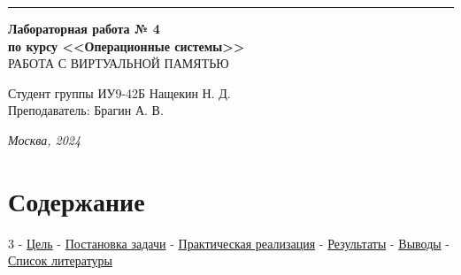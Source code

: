 \documentclass[a4paper, 14pt]{extarticle}
\begin{document}
\begin{titlepage}
\vspace*{-16pt}
\hspace{30pt}\rule{0.866\textwidth}{0.4pt}
  
\vspace{11em}

\begin{center}
\Large {\bf Лабораторная работа № 4} \\ 
\large {\bf по курсу <<Операционные системы>>} \\ 
{РАБОТА С ВИРТУАЛЬНОЙ ПАМЯТЬЮ} \\
\end{center}\normalsize

\vspace{8em}


\begin{flushright}
  {Студент группы ИУ9-42Б Нащекин Н. Д.\hspace*{15pt} \\
  \vspace{2ex}
  Преподаватель: Брагин А. В.\hspace*{15pt}}
\end{flushright}

\bigskip

\vfill
 

\begin{center}
\textsl{Москва, 2024}
\end{center}
\end{titlepage}

\renewcommand{\ttdefault}{pcr}

\setlength{\tabcolsep}{3pt}
\newpage
\setcounter{page}{2}

\section{Содержание}
\begin{flushleft}
3 - \hyperref[sec:Goal]{Цель} - \hyperref[sec:ToDo]{Постановка задачи} - \hyperref[sec:Realization]{Практическая реализация} - \hyperref[sec:Results]{Результаты} - \hyperref[sec:Conclusion]{Выводы} - \hyperref[sec:Literature]{Список литературы}\newline
\end{flushleft}
\pagebreak
\end{document}
